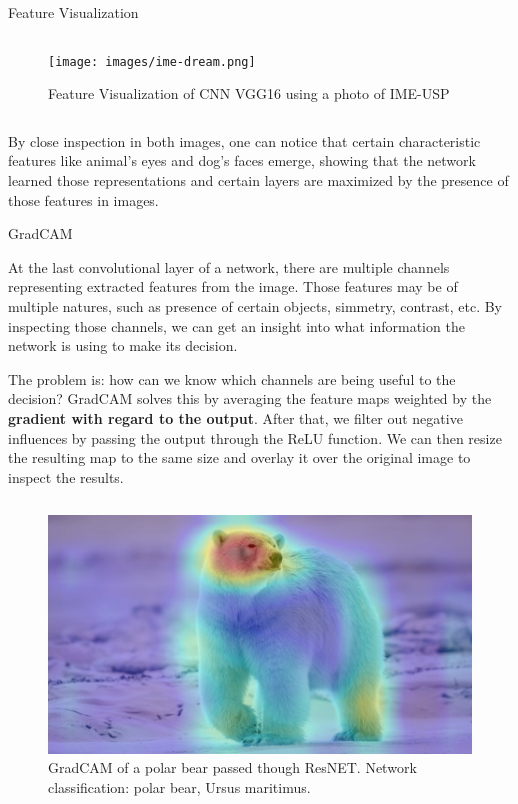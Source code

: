 \documentclass[final]{beamer}
\newlength{\colwidth}
\begin{document}
\begin{frame}[t]
\begin{columns}[t]
\begin{column}{\colwidth}
\begin{block}{Feature Visualization}
\begin{columns}
      \begin{column}{0.5\textwidth}
        \begin{figure}
          \centering
          \texttt{[image: images/ime-dream.png]}
          \caption{Feature Visualization of CNN VGG16 using a photo of IME-USP}
        \end{figure}
      \end{column}
      
    \end{columns}

    By close inspection in both images, one can notice that certain characteristic features like animal's eyes and dog's faces emerge,
    showing that the network learned those representations and certain layers are maximized by the presence of those features in images.
  \end{block}

  \begin{block}{GradCAM}

    At the last convolutional layer of a network, there are multiple channels representing extracted features from the image. Those features may be of multiple natures, such as presence of certain objects, simmetry, contrast, etc. By inspecting those channels, we can get an insight into what information the network is using to make its decision.

    The problem is: how can we know which channels are being useful to the decision? GradCAM solves this by averaging the feature maps weighted by the \textbf{gradient with regard to the output}. After that, we filter out negative influences by passing the output through the ReLU function. We can then resize the resulting map to the same size and overlay it over the original image to inspect the results.
    
    \begin{columns}  
      \begin{column}{0.5\textwidth}
        \begin{figure}
          \centering
          \includegraphics[width=0.9\linewidth]{images/GC_ursopolar.png}
          \caption{GradCAM of a polar bear passed though ResNET. Network classification: polar bear, Ursus maritimus.}
        \end{figure}  
      \end{column}


\end{columns}
\end{block}
\end{column}
\end{columns}
\end{frame}
\end{document}
